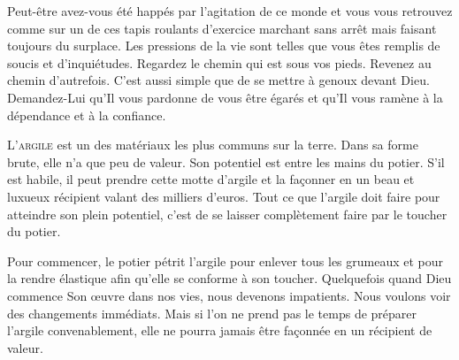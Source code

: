 Peut-être avez-vous été happés par l'agitation de ce monde
 et vous vous retrouvez comme sur un de ces tapis roulants d'exercice
 \ocadr marchant sans arrêt mais faisant toujours du surplace.
 Les pressions de la vie sont telles que vous êtes remplis de soucis
 et d'inquiétudes. Regardez le chemin qui est sous vos pieds.
 Revenez au chemin d'autrefois. C'est aussi simple que de se mettre
 à genoux devant Dieu. Demandez-Lui qu'Il vous pardonne de vous
 être égarés et qu'Il vous ramène à la dépendance et à la confiance. 


\dvrule






\lettrine{L}{'argile} est un des matériaux les plus communs sur la terre.
 Dans sa forme brute, elle n'a que peu de valeur.
 Son potentiel est entre les mains du potier.
 S'il est habile, il peut prendre cette motte d'argile et la fa\c{c}onner
 en un beau et luxueux récipient valant des milliers d'euros.
 Tout ce que l'argile doit faire pour atteindre son plein potentiel,
 c'est de se laisser complètement faire par le toucher du potier. 


Pour commencer, le potier pétrit l'argile pour enlever tous les grumeaux
 et pour la rendre élastique afin qu'elle se conforme à son toucher.
 Quelquefois quand Dieu commence Son \oe{}uvre dans nos vies,
 nous devenons impatients. Nous voulons voir des changements immédiats.
 Mais si l'on ne prend pas le temps de préparer l'argile convenablement,
 elle ne pourra jamais être fa\c{c}onnée en un récipient de valeur. 

